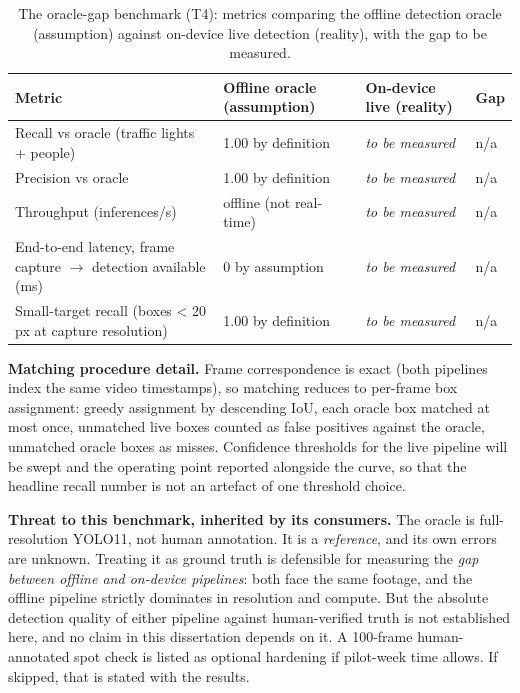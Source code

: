 \begin{longtable}{p{}|p{}|p{}|p{}}
\caption{The oracle-gap benchmark (T4): metrics comparing the offline detection oracle (assumption)
against on-device live detection (reality), with the gap to be measured.}\\
\hline
\textbf{Metric} & \textbf{Offline oracle (assumption)} & \textbf{On-device live (reality)} & \textbf{Gap} \\
\hline
\endhead
\hline
Recall vs oracle (traffic lights + people) & 1.00 by definition & \textit{to be measured} & n/a \\
Precision vs oracle & 1.00 by definition & \textit{to be measured} & n/a \\
Throughput (inferences/s) & offline (not real-time) & \textit{to be measured} & n/a \\
End-to-end latency, frame capture $\rightarrow$ detection available (ms) & 0 by assumption & \textit{to be measured} & n/a \\
Small-target recall (boxes < 20 px at capture resolution) & 1.00 by definition & \textit{to be measured} & n/a \\
\hline
\end{longtable}

\textbf{Matching procedure detail.} Frame correspondence is exact (both pipelines index the same video
timestamps), so matching reduces to per-frame box assignment: greedy assignment by descending IoU,
each oracle box matched at most once, unmatched live boxes counted as false positives against the
oracle, unmatched oracle boxes as misses. Confidence thresholds for the live pipeline will be swept
and the operating point reported alongside the curve, so that the headline recall number is not an
artefact of one threshold choice.

\textbf{Threat to this benchmark, inherited by its consumers.} The oracle is full-resolution YOLO11, not
human annotation. It is a \textit{reference}, and its own errors are unknown. Treating it as ground truth
is defensible for measuring the \textit{gap between offline and on-device pipelines}: both face the same
footage, and the offline pipeline strictly dominates in resolution and compute. But the absolute
detection quality of either pipeline against human-verified truth is not established here, and no
claim in this dissertation depends on it. A 100-frame human-annotated spot check is listed as
optional hardening if pilot-week time allows. If skipped, that is stated with the results.

